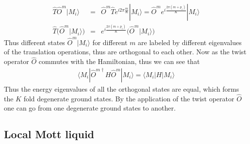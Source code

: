 \documentclass[reprint,prb,superscriptaddress]{revtex4-1}
\begin{document}
\begin{eqnarray}
\hat{T} \hat{O}^m |M_i\rangle &=& \hat{O}^m \hat{T} e^{i2\pi \frac{m}{K}} |M_i\rangle =\hat{O}^m e^{i \frac{2\pi(m+p_i)}{K} } |M_i\rangle \nonumber\\
\hat{T} \bigg(\hat{O}^m |M_i\rangle \bigg) &=&  e^{i \frac{2\pi(m+p_i)}{K} } \bigg( \hat{O}^m |M_i\rangle \bigg)
\end{eqnarray}
Thus different states $ \hat{O}^m |M_i\rangle$ for different $m$ are labeled by different eigenvalues of the translation operations, thus are orthogonal to each other. Now as the twist operator $\hat{O}$ commutes with the Hamiltonian, thus we can see that 
\begin{eqnarray}
\langle M_i| \hat{O}^{m \dagger}  H \hat{O}^m |M_i\rangle =\langle M_i|  H |M_i\rangle 
\end{eqnarray}
Thus the energy eigenvalues of all the orthogonal states are equal, which forms the $K$ fold degenerate ground states. By the application of the twist operator $\hat{O}$ one can go from one degenerate ground states to another.





\subsection{Local Mott liquid}
\label{sec:loc_mott_liquid}
\end{document}
